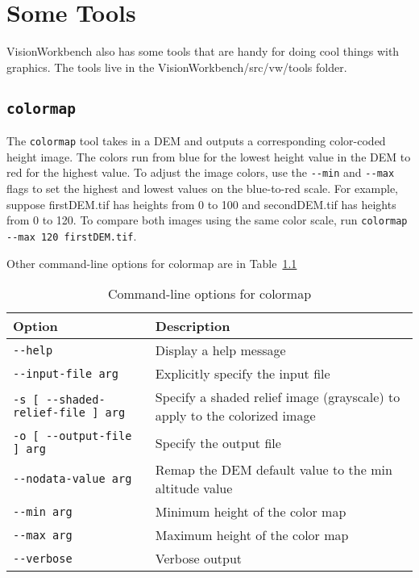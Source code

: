 \chapter{Some Tools}\label{ch:tools}

VisionWorkbench also has some tools that are handy for doing cool things with graphics.  The tools live in the VisionWorkbench/src/vw/tools folder.

\section{{\tt colormap}}\label{sec:colormap}

The \verb#colormap# tool takes in a DEM and outputs a corresponding color-coded height image.  The colors run from blue for the lowest height value in the DEM to red for the highest value.  To adjust the image colors, use the \verb#--min# and \verb#--max# flags to set the highest and lowest values on the blue-to-red scale.  For example, suppose firstDEM.tif has heights from 0 to 100 and secondDEM.tif has heights from 0 to 120.  To compare both images using the same color scale, run \verb#colormap --max 120 firstDEM.tif#.

Other command-line options for colormap are in Table~\ref{tbl:colormap}

\begin{table}
\begin{tabular}{|l|l|} \hline
Option & Description \\ \hline \hline
\verb#--help# & Display a help message \\ \hline
\verb#--input-file arg# & Explicitly specify the input file \\ \hline
\verb#-s [ --shaded-relief-file ] arg# & Specify a shaded relief image (grayscale) to apply to the colorized image \\ \hline
\verb#-o [ --output-file ] arg# & Specify the output file \\ \hline
\verb#--nodata-value arg# & Remap the DEM default value to the min altitude value \\ \hline
\verb#--min arg# & Minimum height of the color map \\ \hline
\verb#--max arg# & Maximum height of the color map \\ \hline
\verb#--verbose# & Verbose output \\ \hline
\end{tabular}
\caption{Command-line options for colormap}
\label{tbl:colormap}
\end{table}

